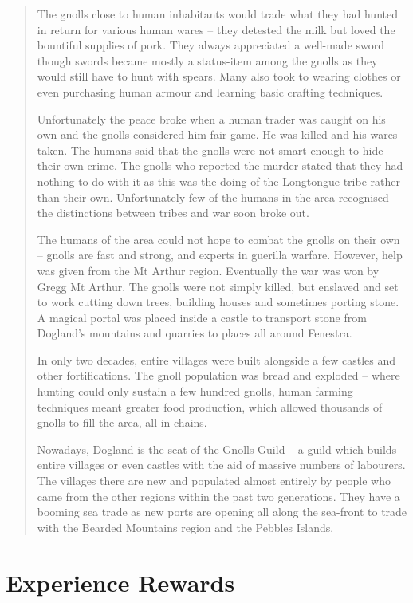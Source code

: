 \begin{multicols}{2}
\begin{quotation}
	The gnolls close to human inhabitants would trade what they had hunted in return for various human wares -- they detested the milk but loved the bountiful supplies of pork.  They always appreciated a well-made sword though swords became mostly a status-item among the gnolls as they would still have to hunt with spears.  Many also took to wearing clothes or even purchasing human armour and learning basic crafting techniques.

	Unfortunately the peace broke when a human trader was caught on his own and the gnolls considered him fair game.  He was killed and his wares taken.  The humans said that the gnolls were not smart enough to hide their own crime.  The gnolls who reported the murder stated that they had nothing to do with it as this was the doing of the Longtongue tribe rather than their own.  Unfortunately few of the humans in the area recognised the distinctions between tribes and war soon broke out.

	The humans of the area could not hope to combat the gnolls on their own -- gnolls are fast and strong, and experts in guerilla warfare.  However, help was given from the Mt Arthur region.  Eventually the war was won by Gregg Mt Arthur.  The gnolls were not simply killed, but enslaved and set to work cutting down trees, building houses and sometimes porting stone.  A magical portal was placed inside a castle to transport stone from Dogland's mountains and quarries to places all around Fenestra.

	In only two decades, entire villages were built alongside a few castles and other fortifications.  The gnoll population was bread and exploded -- where hunting could only sustain a few hundred gnolls, human farming techniques meant greater food production, which allowed thousands of gnolls to fill the area, all in chains.

	Nowadays, Dogland is the seat of the Gnolls Guild -- a guild which builds entire villages or even castles with the aid of massive numbers of labourers.  The villages there are new and populated almost entirely by people who came from the other regions within the past two generations.  They have a booming sea trade as new ports are opening all along the sea-front to trade with the Bearded Mountains region and the Pebbles Islands.
\end{quotation}

\end{multicols}

\chapter{Experience Rewards}

